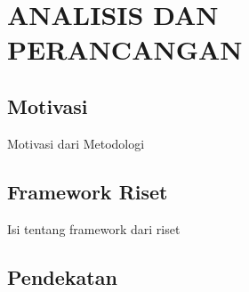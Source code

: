 
\chapter{ANALISIS DAN PERANCANGAN}
\label{cha:3-AnalisisDanPerancangan}


\section{Motivasi}
\label{sec:3-Motivasi}

Motivasi dari Metodologi


\section{Framework Riset}
\label{sub:3-Framework}

Isi tentang framework dari riset

\section{Pendekatan}
\label{sec:3-Pendekatan}